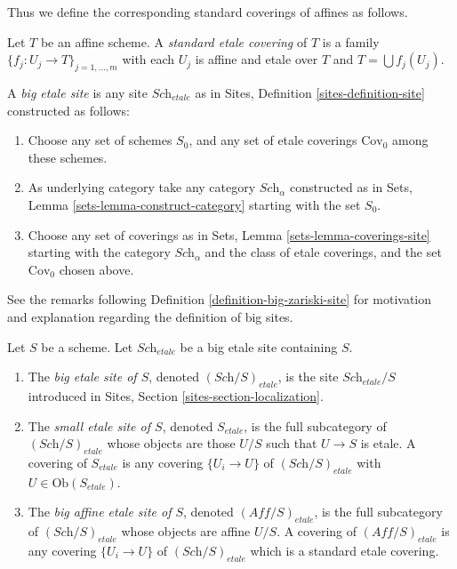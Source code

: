 \noindent
Thus we define the corresponding standard coverings of affines as follows.

\begin{definition}
\label{definition-standard-etale}
Let $T$ be an affine scheme. A {\it standard etale covering}
of $T$ is a family $\{f_j : U_j \to T\}_{j = 1, \ldots, m}$
with each $U_j$ is affine and etale over $T$ and
$T = \bigcup f_j(U_j)$.
\end{definition}

\begin{definition}
\label{definition-big-etale-site}
A {\it big etale site} is any site $\textit{Sch}_{etale}$ as in
Sites, Definition \ref{sites-definition-site} constructed as follows:
\begin{enumerate}
\item Choose any set of schemes $S_0$, and any set of etale coverings
$\text{Cov}_0$ among these schemes.
\item As underlying category take any category $\textit{Sch}_\alpha$
constructed as in Sets, Lemma \ref{sets-lemma-construct-category}
starting with the set $S_0$.
\item Choose any set of coverings as in
Sets, Lemma \ref{sets-lemma-coverings-site} starting with the
category $\textit{Sch}_\alpha$ and the class of etale coverings,
and the set $\text{Cov}_0$ chosen above.
\end{enumerate}
\end{definition}

\noindent
See the remarks following Definition \ref{definition-big-zariski-site}
for motivation and explanation regarding the definition of big sites.

\begin{definition}
\label{definition-big-small-etale}
Let $S$ be a scheme. Let $\textit{Sch}_{etale}$ be a big etale
site containing $S$.
\begin{enumerate}
\item The {\it big etale site of $S$}, denoted
$(\textit{Sch}/S)_{etale}$, is the site $\textit{Sch}_{etale}/S$
introduced in Sites, Section \ref{sites-section-localization}.
\item The {\it small etale site of $S$}, denoted
$S_{etale}$, is the full subcategory of $(\textit{Sch}/S)_{etale}$
whose objects are those $U/S$ such that $U \to S$ is etale.
A covering of $S_{etale}$ is any covering $\{U_i \to U\}$ of
$(\textit{Sch}/S)_{etale}$ with $U \in \text{Ob}(S_{etale})$.
\item The {\it big affine etale site of $S$}, denoted
$(\textit{Aff}/S)_{etale}$, is the full subcategory of
$(\textit{Sch}/S)_{etale}$ whose objects are affine $U/S$.
A covering of $(\textit{Aff}/S)_{etale}$ is any covering
$\{U_i \to U\}$ of $(\textit{Sch}/S)_{etale}$ which is a
standard etale covering.
\end{enumerate}
\end{definition}

